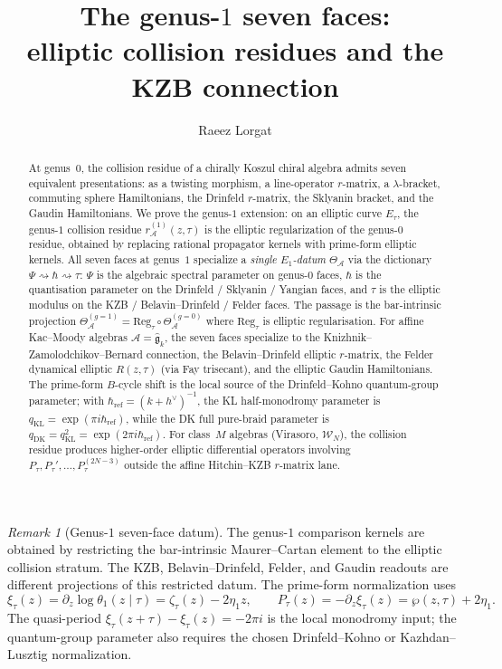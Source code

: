 \documentclass[11pt]{article}
\title{The genus-$1$ seven faces:\\
elliptic collision residues and the KZB connection}
\author{Raeez Lorgat}
\date{}
\theoremstyle{plain}
\theoremstyle{definition}
\theoremstyle{remark}
\newtheorem{remark}[theorem]{Remark}
\newcommand{\fg}{\mathfrak{g}}
\newcommand{\cA}{\mathcal{A}}
\newcommand{\cW}{\mathcal{W}}
\numberwithin{equation}{section}
\begin{document}
\maketitle


\begin{abstract}
At genus~$0$, the collision residue of a chirally Koszul chiral
algebra admits seven equivalent presentations: as a twisting
morphism, a line-operator $r$-matrix, a $\lambda$-bracket, commuting
sphere Hamiltonians, the Drinfeld $r$-matrix, the Sklyanin bracket,
and the Gaudin Hamiltonians. We prove the genus-$1$ extension: on an
elliptic curve $E_\tau$, the genus-$1$ collision residue
$r_\cA^{(1)}(z,\tau)$ is the elliptic regularization of the genus-$0$
residue, obtained by replacing rational propagator kernels with
prime-form elliptic kernels. All seven faces at genus~$1$ specialize a
\emph{single $E_1$-datum} $\Theta_\cA$ via the dictionary
$\Psi \rightsquigarrow \hbar \rightsquigarrow \tau$: $\Psi$ is the
algebraic spectral parameter on genus-$0$ faces, $\hbar$ is the
quantisation parameter on the Drinfeld / Sklyanin / Yangian faces,
and $\tau$ is the elliptic modulus on the KZB / Belavin--Drinfeld /
Felder faces. The passage is the bar-intrinsic projection
$\Theta_\cA^{(g=1)} = \mathrm{Reg}_\tau \circ \Theta_\cA^{(g=0)}$
where $\mathrm{Reg}_\tau$ is elliptic regularisation.
For affine Kac--Moody algebras $\cA = \widehat{\fg}_k$, the seven
faces specialize to the Knizhnik--Zamolodchikov--Bernard connection,
the Belavin--Drinfeld elliptic $r$-matrix, the Felder dynamical
elliptic $R(z,\tau)$ (via Fay trisecant), and the elliptic Gaudin
Hamiltonians. The prime-form $B$-cycle shift is the local source of
the Drinfeld--Kohno quantum-group parameter; with
\(\hbar_{\mathrm{ref}}=(k+h^\vee)^{-1}\), the KL half-monodromy
parameter is
\(q_{\mathrm{KL}}=\exp(\pi i\hbar_{\mathrm{ref}})\), while the DK
full pure-braid parameter is
\(q_{\mathrm{DK}}=q_{\mathrm{KL}}^2
=\exp(2\pi i\hbar_{\mathrm{ref}})\). For class~$M$ algebras (Virasoro,
$\cW_N$), the collision residue produces higher-order elliptic
differential operators involving \(P_\tau,P_\tau',\ldots,P_\tau^{(2N-3)}\)
outside the affine Hitchin--KZB $r$-matrix lane.
\end{abstract}

\begin{remark}[Genus-$1$ seven-face datum]\label{rem:genus1-seven-face-datum}
The genus-$1$ comparison kernels are obtained by restricting the
bar-intrinsic Maurer--Cartan element to the elliptic collision
stratum. The KZB, Belavin--Drinfeld, Felder, and Gaudin readouts are
different projections of this restricted datum. The prime-form
normalization uses
\[
\xi_\tau(z)=\partial_z\log\theta_1(z\mid\tau)
=\zeta_\tau(z)-2\eta_1z,\qquad
P_\tau(z)=-\partial_z\xi_\tau(z)=\wp(z,\tau)+2\eta_1.
\]
The quasi-period \(\xi_\tau(z+\tau)-\xi_\tau(z)=-2\pi i\) is the
local monodromy input; the quantum-group parameter also requires the
chosen Drinfeld--Kohno or Kazhdan--Lusztig normalization.
\end{remark}
\end{document}
